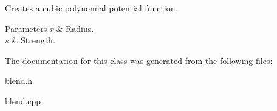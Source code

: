 Creates a cubic polynomial potential function. 


\begin{DoxyParams}{Parameters}
{\em r} & Radius. \\
\hline
{\em s} & Strength. \\
\hline
\end{DoxyParams}


The documentation for this class was generated from the following files:\begin{DoxyCompactItemize}
\item 
blend.h\item 
blend.cpp\end{DoxyCompactItemize}
